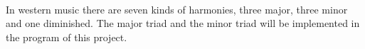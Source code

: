 \begin{minipage}{\linewidth}%
\label{triadPic}
\end{minipage}\\

In western music there are seven kinds of harmonies, three major, three minor and one diminished. The major triad and the minor triad will be implemented in the program of this project.